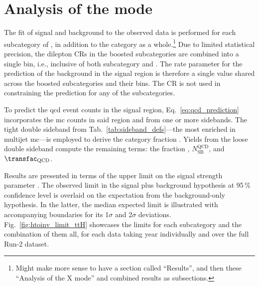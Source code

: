 \section{Analysis of the \texorpdfstring{\ttH}{ttH} mode}
\label{sec:htoinv_analysis_ttH}

The fit of signal and background to the observed data is performed for each subcategory of \ttH, in addition to the category as a whole.\footnote{Might make more sense to have a section called ``Results'', and then these ``Analysis of the X mode'' and combined results as subsections.} Due to limited statistical precision, the dilepton \glspl{CR} in the boosted subcategories are combined into a single bin, i.e., inclusive of both subcategory and \ptmiss. The rate parameter for the prediction of the \ztonunu background in the signal region is therefore a single value shared across the boosted subcategories and their \ptmiss bins. The \singlePhotonCr \gls{CR} is not used in constraining the \ztonunu prediction for any of the subcategories.

To predict the \acrshort{qcd} event counts in the signal region, Eq.~\ref{eq:qcd_prediction} incorporates the \acrshort{mc} counts in said region and from one or more sidebands. The tight double sideband from Tab.~\ref{tab:sideband_defs}---the most enriched in multijet \acrshort{mc}---is employed to derive the category fraction \catFraction. Yields from the loose double sideband compute the remaining terms: the \ptmiss fraction \metFraction, $N_{\mathrm{SB}}^{\mathrm{QCD}}$, and $\transfac_{\mathrm{QCD}}$.

Results are presented in terms of the upper limit on the signal strength parameter \BRHinvFull. The observed limit in the signal plus background hypothesis at 95\,\% confidence level is overlaid on the expectation from the background-only hypothesis. In the latter, the median expected limit is illustrated with accompanying boundaries for its 1$\sigma$ and 2$\sigma$ deviations. Fig.~\ref{fig:htoinv_limit_ttH} showcases the limits for each \ttH subcategory and the combination of them all, for each data taking year individually and over the full Run-2 dataset.

